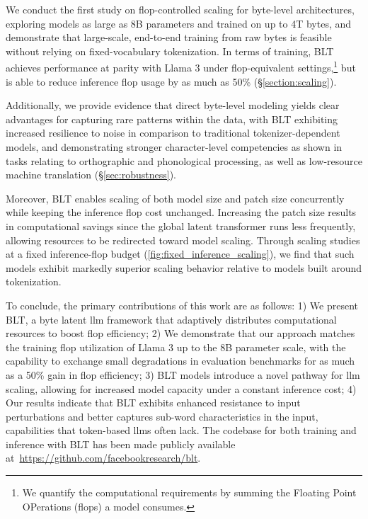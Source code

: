 We conduct the first study on flop-controlled scaling for byte-level architectures, exploring models as large as 8B parameters and trained on up to 4T bytes, and demonstrate that large-scale, end-to-end training from raw bytes is feasible without relying on fixed-vocabulary tokenization. In terms of training, {\textsc BLT} achieves performance at parity with Llama 3 under flop-equivalent settings,\footnote{We quantify the computational requirements by summing the Floating Point OPerations (flops) a model consumes.} but is able to reduce inference flop usage by as much as 50\% (\S\ref{section:scaling}). 

Additionally, we provide evidence that direct byte-level modeling yields clear advantages for capturing rare patterns within the data, with {\textsc BLT} exhibiting increased resilience to noise in comparison to traditional tokenizer-dependent models, and demonstrating stronger character-level competencies as shown in tasks relating to orthographic and phonological processing, as well as low-resource machine translation (\S\ref{sec:robustness}). 

Moreover, {\textsc BLT} enables scaling of both model size and patch size concurrently while keeping the inference flop cost unchanged. Increasing the patch size results in computational savings since the global latent transformer runs less frequently, allowing resources to be redirected toward model scaling. Through scaling studies at a fixed inference-flop budget (\autoref{fig:fixed_inference_scaling}), we find that such models exhibit markedly superior scaling behavior relative to models built around tokenization.

To conclude, the primary contributions of this work are as follows: 1) We present {\textsc BLT}, a byte latent llm framework that adaptively distributes computational resources to boost flop efficiency; 2) We demonstrate that our approach matches the training flop utilization of Llama 3 up to the 8B parameter scale, with the capability to exchange small degradations in evaluation benchmarks for as much as a 50\% gain in flop efficiency; 3) {\textsc BLT} models introduce a novel pathway for llm scaling, allowing for increased model capacity under a constant inference cost; 4) Our results indicate that {\textsc BLT} exhibits enhanced resistance to input perturbations and better captures sub-word characteristics in the input, capabilities that token-based llms often lack. The codebase for both training and inference with {\textsc BLT} has been made publicly available at~\url{https://github.com/facebookresearch/blt}.


